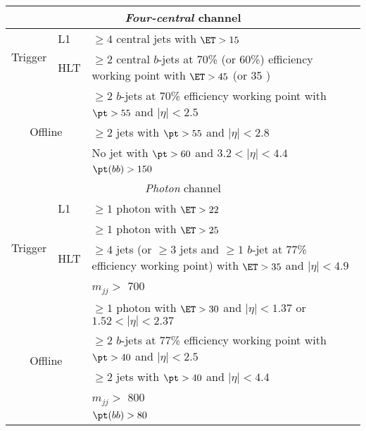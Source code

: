 \documentclass[PAPER, american,coverpage,texlive=2016, english]{\ATLASLATEXPATH atlasdoc}
\providecommand{\DIFaddbeginFL}{} %
\providecommand{\DIFaddendFL}{} %
\providecommand{\DIFdelbeginFL}{} %
\providecommand{\DIFdelendFL}{} %
\begin{document}
\begin{table}[htbp]
{\begin{tabular}{ l | l | l }
            \DIFdelbeginFL %
\DIFdelendFL \DIFaddbeginFL \multicolumn{3}{c}{\textit{Four-central} channel} \DIFaddendFL \\
            \hline
            \DIFdelbeginFL %
\DIFdelendFL \DIFaddbeginFL \multirow{2}{*}{Trigger} \DIFaddendFL & L1                    & $\geq4$ central jets with $\ET > 15$ \GeV{} \\
            \cline{2-3}
			                         & HLT   & $\geq2$ central $b$-jets at 70\% (or 60\%) efficiency working point with $\ET > 45$ \GeV{} (or 35 \GeV{}) \\
            \hline
            \multicolumn{2}{c|}{\multirow{4}{*}{Offline}} & $\geq2$ $b$-jets at 70\% efficiency working point with $\pt>55$ \GeV{} and $|\eta|<2.5$\\
            \multicolumn{2}{c|}{}                         & $\geq2$ jets with $\pt>55$ \GeV{} and $|\eta|<2.8$  \\
            \multicolumn{2}{c|}{}                         & No jet with $\pt>60$ \GeV{} and $3.2<|\eta|<4.4$    \\
            \multicolumn{2}{c|}{}                        & $\pt(bb)>150$ \GeV{}                       \\
            \hline

            \DIFdelbeginFL %
\DIFdelendFL \DIFaddbeginFL \multicolumn{3}{c}{ \textit{Photon} channel} \DIFaddendFL \\
            \hline
       \multirow{4}{*}{Trigger} &     L1                    & $\geq1$ photon with $\ET > 22$ \GeV{} \\
            \cline{2-3}
                                & \multirow{3}{*}{HLT}  & $\geq1$ photon with $\ET > 25$ \GeV{}\\
								&         & $\geq4$ jets (or $\geq3$ jets and $\geq1$ $b$-jet at 77\% efficiency working point) with $\ET>35$ \GeV{} and $|\eta|<4.9$  \\
                                &                         & $m_{jj}>$ 700 \GeV{} \\
            \hline
           \multicolumn{2}{c|}{\multirow{5}{*}{Offline}} & $\geq 1$ photon with $\ET > 30$ \GeV{} and $|\eta|<1.37$ or $1.52 < |\eta|<2.37$\\
           \multicolumn{2}{c|}{}                         & $\geq2$ $b$-jets at 77\% efficiency working point with $\pt>40$ \GeV{} and $|\eta|<2.5$  \\
           \multicolumn{2}{c|}{}                         & $\geq2$ jets with $\pt>40$ \GeV{} and $|\eta|<4.4$  \\
           \multicolumn{2}{c|}{}                         & $m_{jj} >$ 800 \GeV{}      \\
           \multicolumn{2}{c|}{}                        & $\pt(bb)>80$ \GeV{}                         \\

            \hline \hline
         \end{tabular}
      }
\end{table}
\end{document}

